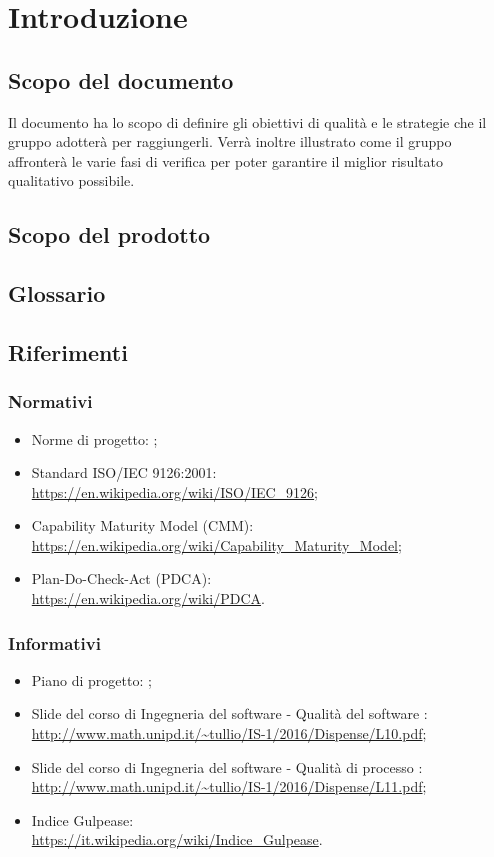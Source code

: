 \documentclass[PianoDiQualifica.tex]{subfiles}
\begin{document}
\section{Introduzione}
	\subsection{Scopo del documento}
		Il documento ha lo scopo di definire gli obiettivi di qualità e le strategie che il gruppo \GRUPPO{}
		adotterà per raggiungerli. Verrà inoltre illustrato come il gruppo affronterà le varie fasi di verifica
		per poter garantire il miglior risultato qualitativo possibile.
	\subsection{Scopo del prodotto}
		\SCOPO
	\subsection{Glossario}
		\GLOSSARIO
	\subsection{Riferimenti}
		\subsubsection{Normativi}
			\begin{itemize}
				\item Norme di progetto: \NPdocRR{};
				\item Standard ISO/IEC 9126:2001: \\
				\url{https://en.wikipedia.org/wiki/ISO/IEC_9126};
				\item Capability Maturity Model (CMM): \\
				\url{https://en.wikipedia.org/wiki/Capability_Maturity_Model};
				\item Plan-Do-Check-Act (PDCA): \\
				\url{https://en.wikipedia.org/wiki/PDCA}.
			\end{itemize}
		\subsubsection{Informativi}
			\begin{itemize}
				\item Piano di progetto: \PPdocRR{};
				\item Slide del corso di Ingegneria del software - Qualità del software : \\
				\url{http://www.math.unipd.it/~tullio/IS-1/2016/Dispense/L10.pdf};
				\item Slide del corso di Ingegneria del software - Qualità di processo : \\
				\url{http://www.math.unipd.it/~tullio/IS-1/2016/Dispense/L11.pdf};
				\item Indice Gulpease: \\
				\url{https://it.wikipedia.org/wiki/Indice_Gulpease}.
			\end{itemize}
			
\end{document}
